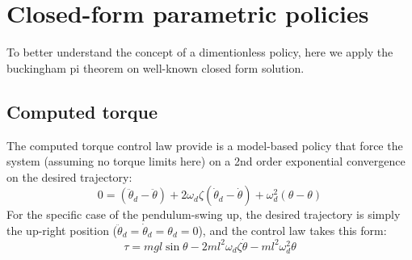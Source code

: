 





\newpage
\section{Closed-form parametric policies}

To better understand the concept of a dimentionless policy, here we apply the buckingham pi theorem on well-known closed form solution.

\subsection{Computed torque}

The computed torque control law provide is a model-based policy that force the system (assuming no torque limits here) on a 2nd order exponential convergence on the desired trajectory:
\begin{equation}
0 = (\ddot{\theta}_d - \ddot{\theta})+ 2 \omega_d \zeta (\dot{\theta}_d - \dot{\theta}) + \omega_d^2 (\theta - \theta)
\end{equation}
For the specific case of the pendulum-swing up, the desired trajectory is simply the up-right position ($\ddot{\theta}_d = \dot{\theta}_d = \theta_d = 0$), and the control law takes this form:
\begin{equation}
\tau = mgl \sin \theta - 2 m l^2 \omega_d \zeta \dot{\theta} - m l^2 \omega_d^2 \theta
\label{eq:ct}
\end{equation}

